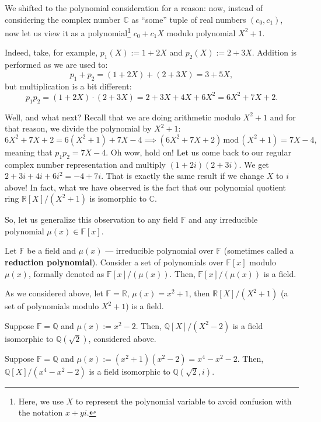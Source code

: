 \documentclass[../lecture-notes.tex]{subfiles}
\begin{document}
We shifted to the polynomial consideration for a reason: now, instead of considering the complex number $\mathbb{C}$ as ``some'' tuple of real numbers $(c_0,c_1)$, now let us view it as a polynomial\footnote{Here, we use $X$ to represent the polynomial variable to avoid confusion with the notation $x+yi$.} $c_0+c_1X$ modulo polynomial $X^2+1$. 

\begin{example}
Indeed, take, for example, $p_1(X) := 1+2X$ and $p_2(X) := 2+3X$. Addition is performed as we are used to:
\begin{equation}
    p_1 + p_2 = (1+2X) + (2+3X) = 3+5X,
\end{equation}
but multiplication is a bit different:
\begin{equation}
    p_1p_2 = (1+2X) \cdot (2+3X) = 2+3X+4X+6X^2 = 6X^2+7X+2.
\end{equation}

Well, and what next? Recall that we are doing arithmetic modulo $X^2+1$ and for that reason, we divide the polynomial by $X^2+1$:
\begin{equation}
    6X^2+7X+2 = 6(X^2+1) + 7X - 4 \implies (6X^2+7X+2) \,\text{mod}\, (X^2+1) = 7X-4,
\end{equation}
meaning that $p_1p_2 = 7X-4$. Oh wow, hold on! Let us come back to our regular complex number representation and multiply $(1+2i)(2+3i)$. We get $2+3i+4i+6i^2=-4+7i$. That is exactly the same result if we change $X$ to $i$ above! In fact, what we have observed is the fact that our polynomial quotient ring $\mathbb{R}[X]/(X^2+1)$ is isomorphic to $\mathbb{C}$.
\end{example}

So, let us generalize this observation to any field $\mathbb{F}$ and any irreducible polynomial $\mu(x) \in \mathbb{F}[x]$.

\begin{theorem}
    Let $\mathbb{F}$ be a field and $\mu(x)$ --- irreducible polynomial over $\mathbb{F}$ (sometimes called a \textbf{reduction polynomial}). Consider a set of polynomials over $\mathbb{F}[x]$ modulo $\mu(x)$, formally denoted as $\mathbb{F}[x]/(\mu(x))$. Then, $\mathbb{F}[x]/(\mu(x))$ is a field.
\end{theorem}

\begin{example}
    As we considered above, let $\mathbb{F}=\mathbb{R}$, $\mu(x)=x^2+1$, then $\mathbb{R}[X]/(X^2+1)$ (a set of polynomials modulo $X^2+1$) is a field.
\end{example}
\begin{example}
    Suppose $\mathbb{F}=\mathbb{Q}$ and $\mu(x) := x^2-2$. Then, $\mathbb{Q}[X]/(X^2-2)$ is a field isomorphic to $\mathbb{Q}(\sqrt{2})$, considered above.
\end{example}
\begin{example}
    Suppose $\mathbb{F}=\mathbb{Q}$ and $\mu(x) := (x^2+1)(x^2-2)=x^4-x^2-2$. Then, $\mathbb{Q}[X]/(x^4-x^2-2)$ is a field isomorphic to $\mathbb{Q}(\sqrt{2},i)$.
\end{example}
\end{document}
